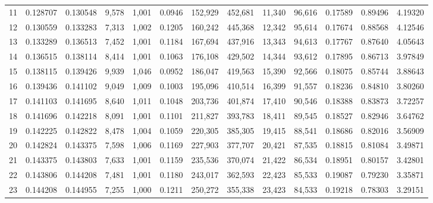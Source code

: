 \begin{tabular}{rrrrrrrrrrrrr}
11  &  0.128707 &  0.130548 &   9,578 &  1,001 &                                     0.0946 &  152,929 &  452,681 &   11,340 &   96,616 &  0.17589 &  0.89496 &  4.19320 \\
12  &  0.130559 &  0.133283 &   7,313 &  1,002 &                                     0.1205 &  160,242 &  445,368 &   12,342 &   95,614 &  0.17674 &  0.88568 &  4.12546 \\
13  &  0.133289 &  0.136513 &   7,452 &  1,001 &                                     0.1184 &  167,694 &  437,916 &   13,343 &   94,613 &  0.17767 &  0.87640 &  4.05643 \\
14  &  0.136515 &  0.138114 &   8,414 &  1,001 &                                     0.1063 &  176,108 &  429,502 &   14,344 &   93,612 &  0.17895 &  0.86713 &  3.97849 \\
15  &  0.138115 &  0.139426 &   9,939 &  1,046 &                                     0.0952 &  186,047 &  419,563 &   15,390 &   92,566 &  0.18075 &  0.85744 &  3.88643 \\
16  &  0.139436 &  0.141102 &   9,049 &  1,009 &                                     0.1003 &  195,096 &  410,514 &   16,399 &   91,557 &  0.18236 &  0.84810 &  3.80260 \\
17  &  0.141103 &  0.141695 &   8,640 &  1,011 &                                     0.1048 &  203,736 &  401,874 &   17,410 &   90,546 &  0.18388 &  0.83873 &  3.72257 \\
18  &  0.141696 &  0.142218 &   8,091 &  1,001 &                                     0.1101 &  211,827 &  393,783 &   18,411 &   89,545 &  0.18527 &  0.82946 &  3.64762 \\
19  &  0.142225 &  0.142822 &   8,478 &  1,004 &                                     0.1059 &  220,305 &  385,305 &   19,415 &   88,541 &  0.18686 &  0.82016 &  3.56909 \\
20  &  0.142824 &  0.143375 &   7,598 &  1,006 &                                     0.1169 &  227,903 &  377,707 &   20,421 &   87,535 &  0.18815 &  0.81084 &  3.49871 \\
21  &  0.143375 &  0.143803 &   7,633 &  1,001 &                                     0.1159 &  235,536 &  370,074 &   21,422 &   86,534 &  0.18951 &  0.80157 &  3.42801 \\
22  &  0.143806 &  0.144208 &   7,481 &  1,001 &                                     0.1180 &  243,017 &  362,593 &   22,423 &   85,533 &  0.19087 &  0.79230 &  3.35871 \\
23  &  0.144208 &  0.144955 &   7,255 &  1,000 &                                     0.1211 &  250,272 &  355,338 &   23,423 &   84,533 &  0.19218 &  0.78303 &  3.29151 \\

\end{tabular}
